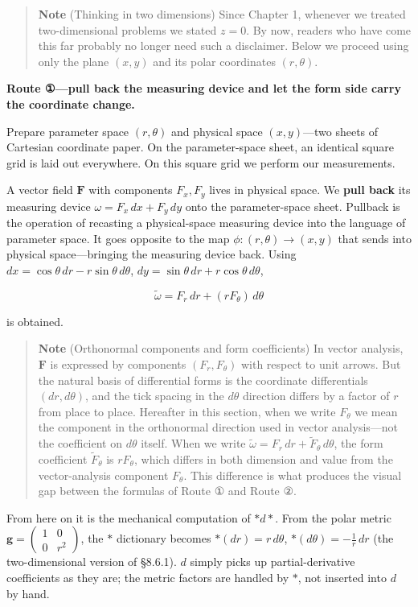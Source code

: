 \documentclass[a4paper,12pt,openany]{book}
\begin{document}
\begin{quote}
\textbf{Note} (Thinking in two dimensions) Since Chapter 1, whenever we
treated two-dimensional problems we stated \(z=0\). By now, readers who
have come this far probably no longer need such a disclaimer. Below we
proceed using only the plane \((x,y)\) and its polar coordinates
\((r,\theta)\).
\end{quote}

\textbf{Route ①—pull back the measuring device and let the form side carry the coordinate change.}

Prepare parameter space \((r,\theta)\) and physical space
\((x,y)\)—two sheets of Cartesian coordinate paper. On the
parameter-space sheet, an identical square grid is laid out everywhere.
On this square grid we perform our measurements.

A vector field \(\mathbf{F}\) with components \(F_x,F_y\) lives in
physical space. We \textbf{pull back} its measuring device
\(\omega = F_x\,dx + F_y\,dy\) onto the parameter-space sheet. Pullback
is the operation of recasting a physical-space measuring device into the
language of parameter space. It goes opposite to the map
\(\phi: (r,\theta) \to (x,y)\) that sends into physical space—bringing
the measuring device back. Using
\(dx = \cos\theta\,dr - r\sin\theta\,d\theta\),
\(dy = \sin\theta\,dr + r\cos\theta\,d\theta\),

\[\tilde{\omega} = F_r\,dr + (r F_\theta)\,d\theta\]

is obtained.

\begin{quote}
\textbf{Note} (Orthonormal components and form coefficients) In vector
analysis, \(\mathbf{F}\) is expressed by components \((F_r, F_\theta)\)
with respect to unit arrows. But the natural basis of differential forms
is the coordinate differentials \((dr, d\theta)\), and the tick spacing
in the \(d\theta\) direction differs by a factor of \(r\) from place to
place. Hereafter in this section, when we write \(F_\theta\) we mean the
component in the orthonormal direction used in vector analysis—not the
coefficient on \(d\theta\) itself. When we write
\(\tilde{\omega} = F_r\,dr + \tilde{F}_\theta\,d\theta\), the form
coefficient \(\tilde{F}_\theta\) is \(r F_\theta\), which differs in
both dimension and value from the vector-analysis component
\(F_\theta\). This difference is what produces the visual gap between
the formulas of Route ① and Route ②.
\end{quote}

From here on it is the mechanical computation of \(\ast d\ast\). From
the polar metric
\(\mathbf{g} = \begin{pmatrix} 1 & 0 \\ 0 & r^2 \end{pmatrix}\), the
\(\ast\) dictionary becomes \(\ast(dr) = r\,d\theta\),
\(\ast(d\theta) = -\frac{1}{r}\,dr\) (the two-dimensional version of
§8.6.1). \(d\) simply picks up partial-derivative coefficients as they
are; the metric factors are handled by \(\ast\), not inserted into \(d\)
by hand.
\end{document}
